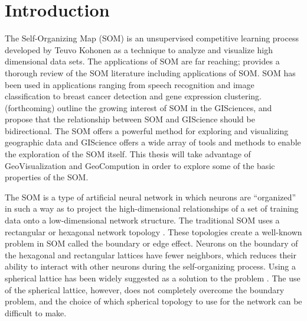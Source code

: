 \documentclass[10pt,titlepage]{article}
\begin{document}
\section{Introduction}
The Self-Organizing Map (SOM) is an unsupervised competitive learning process
developed by Teuvo Kohonen as a technique to analyze and visualize high
dimensional data sets.  The applications of SOM are far reaching;
\cite{Kohonen2000} provides a thorough review of the SOM literature including
applications of SOM.  SOM has been used in applications ranging from speech
recognition and image classification to breast cancer detection and gene
expression clustering.  \citeauthor{skupin07} (forthcoming) outline the growing interest of SOM in
the GISciences, and propose that the relationship between SOM and GIScience
should be bidirectional.  The SOM offers a powerful method for exploring and
visualizing geographic data and GIScience offers a wide array of tools
and methods to enable the exploration of the SOM itself.  This thesis will take
advantage of GeoVisualization and GeoCompution in order to explore some of the basic
properties of the SOM.

The SOM is a type of artificial neural network in which neurons are ``organized''
in such a way as to project the high-dimensional relationships of a set of
training data onto a low-dimensional network structure.  The traditional
SOM uses a rectangular or hexagonal network topology \citep{Kohonen2000}.  These topologies 
create a well-known problem in SOM called the boundary or edge effect.  Neurons on
the boundary of the hexagonal and rectangular lattices have fewer neighbors,
which reduces their ability to interact with other neurons during the
self-organizing process.  Using a spherical lattice has been widely suggested as a
solution to the problem \citep{ritter99, boudjemai2003, sangole03,
Nishio:2006fk, wu2006}. The use of the spherical lattice, however, does not
completely overcome the boundary problem, and the choice of which spherical
topology to use for the network can be difficult to make.
\end{document}
